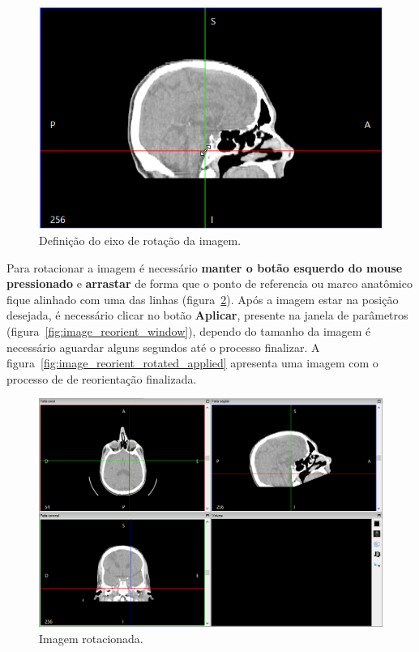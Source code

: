 \begin{figure}[!htbp]
\centering
\includegraphics[scale=0.4]{../user_guide_figures/invesalius_screen/image_reorient_adjust_center.png}
\caption{Definição do eixo de rotação da imagem.}
\label{fig:image_reorient_adjust_center}
\end{figure}

Para rotacionar a imagem é necessário \textbf{manter o botão esquerdo do mouse pressionado} e \textbf{arrastar} de forma que o ponto de referencia ou marco anatômico fique alinhado com uma das linhas (figura~\ref{fig:image_reorient_rotated}). Após a imagem estar na posição desejada, é necessário clicar no botão \textbf{Aplicar}, presente na janela de parâmetros (figura~\ref{fig:image_reorient_window}), dependo do tamanho da imagem é necessário aguardar alguns segundos até o processo finalizar. A figura~\ref{fig:image_reorient_rotated_applied} apresenta uma imagem com o processo de de reorientação finalizada.

\begin{figure}[!htb]
\centering
\includegraphics[scale=0.4]{../user_guide_figures/invesalius_screen/image_reorient_rotated_pt.png}
\caption{Imagem rotacionada.}
\label{fig:image_reorient_rotated}
\end{figure}

